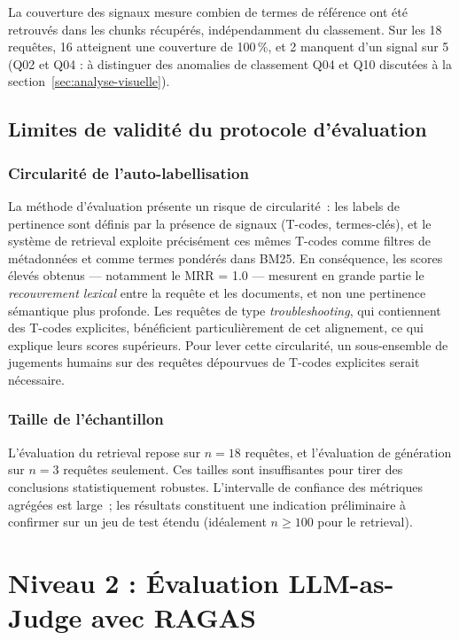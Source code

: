 La couverture des signaux mesure combien de termes de référence ont été retrouvés dans les chunks récupérés, indépendamment du classement. Sur les 18 requêtes, 16 atteignent une couverture de 100\,\%, et 2 manquent d'un signal sur 5 (Q02 et Q04 : à distinguer des anomalies de classement Q04 et Q10 discutées à la section~\ref{sec:analyse-visuelle}).

\subsection{Limites de validité du protocole d'évaluation}
\label{subsec:limites-validite}

\subsubsection{Circularité de l'auto-labellisation}
La méthode d'évaluation présente un risque de circularité~: les labels de pertinence sont définis par la présence de signaux (T-codes, termes-clés), et le système de retrieval exploite précisément ces mêmes T-codes comme filtres de métadonnées et comme termes pondérés dans BM25. En conséquence, les scores élevés obtenus --- notamment le MRR = 1.0 --- mesurent en grande partie le \emph{recouvrement lexical} entre la requête et les documents, et non une pertinence sémantique plus profonde. Les requêtes de type \textit{troubleshooting}, qui contiennent des T-codes explicites, bénéficient particulièrement de cet alignement, ce qui explique leurs scores supérieurs. Pour lever cette circularité, un sous-ensemble de jugements humains sur des requêtes dépourvues de T-codes explicites serait nécessaire.

\subsubsection{Taille de l'échantillon}
L'évaluation du retrieval repose sur $n = 18$ requêtes, et l'évaluation de génération sur $n = 3$ requêtes seulement. Ces tailles sont insuffisantes pour tirer des conclusions statistiquement robustes. L'intervalle de confiance des métriques agrégées est large~; les résultats constituent une indication préliminaire à confirmer sur un jeu de test étendu (idéalement $n \geq 100$ pour le retrieval).

\section{Niveau 2 : Évaluation LLM-as-Judge avec RAGAS}
\label{sec:ragas}
